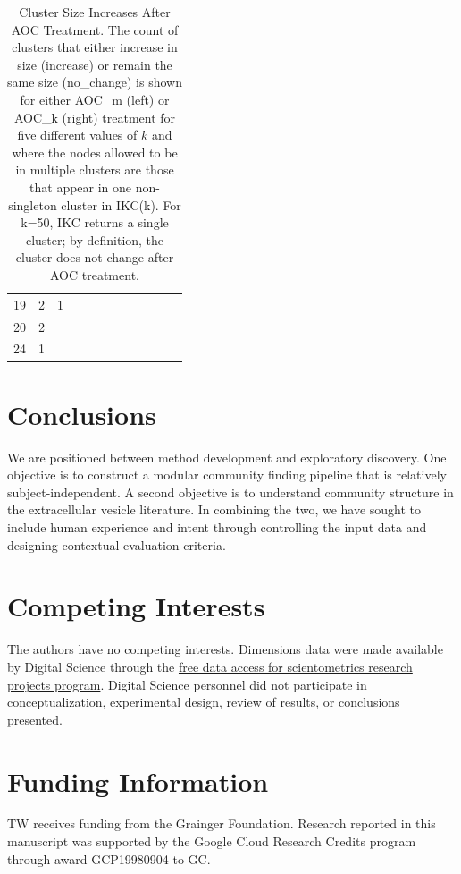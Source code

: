 \documentclass[12pt, oneside]{article}   	%
\begin{document}
\begin{table}
{\begin{tabular}{clllllllllll}
				19 &   2 &   1 &  &  &  &  &  &  &  &  \\ 
				20 &   2 &  &  &  &  &  &  &  &  &  \\ 
				24 &   1 &  &  &  &  &  &  &  &  &  \\ 
				\hline
		\end{tabular}}
		\caption{Cluster Size Increases After AOC Treatment. The count of clusters that either increase in size (increase) or remain the same size (no\_change) is shown
			for either AOC\_m (left) or AOC\_k (right) treatment for five different values of $k$ and where the nodes allowed to be in multiple clusters are those that appear in one non-singleton cluster in IKC(k). 
			For k=50, IKC returns a single cluster; by definition, the cluster does not change after AOC treatment.}
		\label{tab:tab2}
	\end{table}
	
	\clearpage
	
	\section{Conclusions} We are positioned between method development and exploratory discovery. One objective is to construct a modular community finding pipeline that is relatively subject-independent. A second objective is to understand community structure in the extracellular vesicle literature. In combining the two, we have sought to include human experience and intent \citep{vonluxburg2012clustering} through controlling the input data and designing contextual evaluation criteria.
	
	\section*{Competing Interests} \vspace{3mm} The authors have no competing interests. Dimensions data were made available by Digital Science through the \href{http://www.dimensions.ai/scientometric-research/.}{free data access for scientometrics research projects program}. Digital Science personnel did not participate in conceptualization, experimental design, review of results, or conclusions presented. 
	
	\section*{Funding Information} TW receives funding from the Grainger Foundation. Research reported in this manuscript was supported by the Google Cloud Research Credits program through award GCP19980904 to GC.
	
\end{document}
